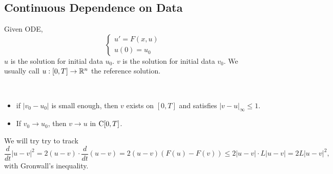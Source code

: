 \subsection{Continuous Dependence on Data}
Given ODE,
\[
    \begin{cases}
        u' = F(x, u)\\
        u(0) = u_0
    \end{cases}  
\]
$u$ is the solution for initial data $u_0$. $v$ is the solution for initial data $v_0$. We usually call $u:[0,T] \to \mathbb{R}^n$ the reference solution.

\begin{theorem}
    ~\ 
    \begin{itemize}
        \item if $|v_0 - u_0|$ is small enough, then $v$ exists on $[0,T]$ and satisfies $|v-u|_\infty \le 1$.
        \item If $v_0 \to u_0$, then $v\to u$ in $\operatorname{C}[0,T]$.
    \end{itemize}
\end{theorem}

We will try try to track 
\[
    \frac{d}{dt}|u-v|^2 = 2(u-v) \cdot \frac{d}{dt}(u-v) = 2(u-v) (F(u) - F(v)) \le 2|u-v| \cdot L |u-v| = 2L|u-v|^2,    
\]
with Gronwall's inequality.